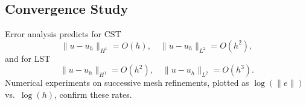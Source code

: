 \subsection{Convergence Study}

Error analysis predicts for CST
\begin{equation}
  \|u-u_h\|_{H^1}=O(h),
  \quad
  \|u-u_h\|_{L^2}=O(h^2),
\end{equation}
and for LST
\begin{equation}
  \|u-u_h\|_{H^1}=O(h^2),
  \quad
  \|u-u_h\|_{L^2}=O(h^3).
\end{equation}
Numerical experiments on successive mesh refinements, plotted as $\log(\|e\|)$ vs.\ $\log(h)$, confirm these rates. \citep{Johnson2009}

